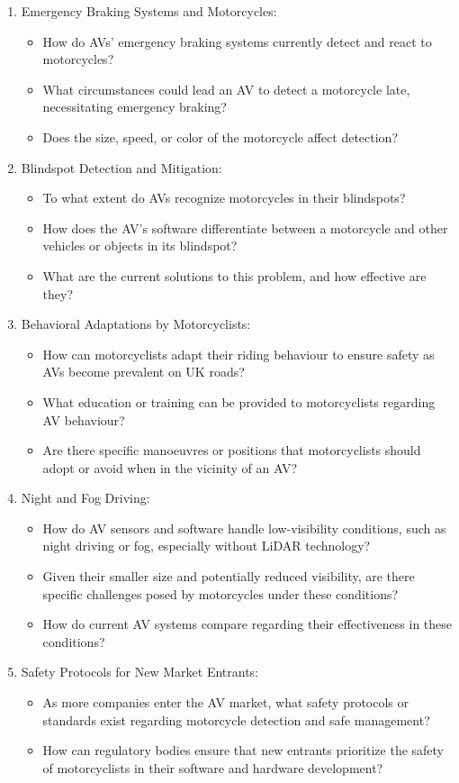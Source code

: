 \documentclass[conference]{IEEEtran}
\begin{document}
	\begin{enumerate}
		\item Emergency Braking Systems and Motorcycles:
		\begin{itemize}
			\item How do AVs' emergency braking systems currently detect and react to motorcycles?
			\item What circumstances could lead an AV to detect a motorcycle late, necessitating emergency braking?
			\item Does the size, speed, or color of the motorcycle affect detection?
		\end{itemize}
		\item Blindspot Detection and Mitigation:
		\begin{itemize}
			\item To what extent do AVs recognize motorcycles in their blindspots?
			\item How does the AV's software differentiate between a motorcycle and other vehicles or objects in its blindspot?
			\item What are the current solutions to this problem, and how effective are they?
		\end{itemize}
		\item Behavioral Adaptations by Motorcyclists:
		\begin{itemize}
			\item How can motorcyclists adapt their riding behaviour to ensure safety as AVs become prevalent on UK roads?
			\item What education or training can be provided to motorcyclists regarding AV behaviour?
			\item Are there specific manoeuvres or positions that motorcyclists should adopt or avoid when in the vicinity of an AV?
		\end{itemize}
		\item Night and Fog Driving:
		\begin{itemize}
			\item How do AV sensors and software handle low-visibility conditions, such as night driving or fog, especially without LiDAR technology?
			\item Given their smaller size and potentially reduced visibility, are there specific challenges posed by motorcycles under these conditions?
			\item How do current AV systems compare regarding their effectiveness in these conditions?
		\end{itemize}

		\item Safety Protocols for New Market Entrants:
		\begin{itemize}
			\item As more companies enter the AV market, what safety protocols or standards exist regarding motorcycle detection and safe management?
			\item How can regulatory bodies ensure that new entrants prioritize the safety of motorcyclists in their software and hardware development?
		\end{itemize}
	\end{enumerate}
\end{document}
